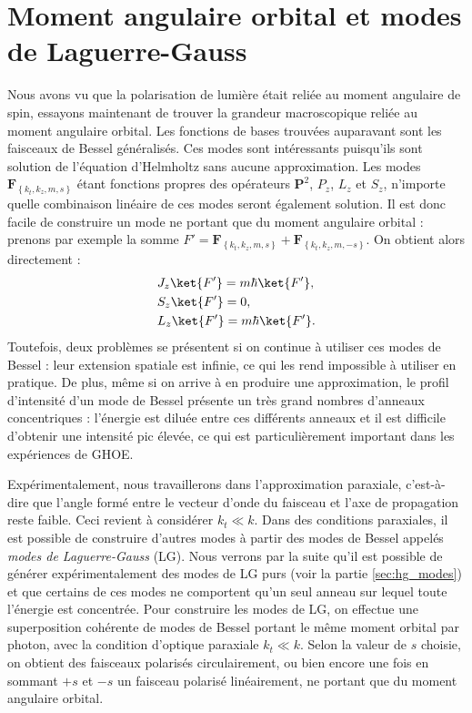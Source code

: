 \section{Moment angulaire orbital et modes de Laguerre-Gauss}
\label{sec:oamLG}
Nous avons vu que la polarisation de lumière était reliée au moment angulaire de spin, essayons maintenant de trouver la grandeur macroscopique reliée au moment angulaire orbital. 
Les fonctions de bases trouvées auparavant sont les faisceaux de Bessel généralisés. Ces modes sont intéressants puisqu'ils sont solution de l'équation d'Helmholtz sans aucune approximation. Les modes $\bm{F}_{\left\{k_t,k_z,m,s\right\}}$ étant fonctions propres des opérateurs $\bm{P}^2$, $P_z$, $L_z$ et $S_z$, n'importe quelle combinaison linéaire de ces modes seront également solution. Il est donc facile de construire un mode ne portant que du moment angulaire orbital : prenons par exemple la somme $F'=\bm{F}_{\left\{k_t,k_z,m,s\right\}}+\bm{F}_{\left\{k_t,k_z,m,-s\right\}}$. On obtient alors directement :
\begin{align*}
&J_z\ket{F'} = m\hbar\ket{F'},\\
&S_z\ket{F'} = 0,\\
&L_z\ket{F'} = m\hbar\ket{F'}.
\end{align*}
Toutefois, deux problèmes se présentent si on continue à utiliser ces modes de Bessel : leur extension spatiale est infinie, ce qui les rend impossible à utiliser en pratique. De plus, même si on arrive à en produire une approximation, le profil d'intensité d'un mode de Bessel présente un très grand nombres d'anneaux concentriques : l'énergie est diluée entre ces différents anneaux et il est difficile d'obtenir une intensité pic élevée, ce qui est particulièrement important dans les expériences de GHOE.\par Expérimentalement, nous travaillerons dans l'approximation paraxiale, c'est-à-dire que l'angle formé entre le vecteur d'onde du faisceau et l'axe de propagation reste faible. Ceci revient à considérer $k_t \ll k$. Dans des conditions paraxiales, il est possible de construire d'autres modes à partir des modes de Bessel appelés \textit{modes de Laguerre-Gauss} (LG). Nous verrons par la suite qu'il est possible de générer expérimentalement des modes de LG purs (voir la partie \ref{sec:hg_modes}) et que certains de ces modes ne comportent qu'un seul anneau sur lequel toute l'énergie est concentrée.
Pour construire les modes de LG, on effectue une superposition cohérente de modes de Bessel portant le même moment orbital par photon, avec la condition d'optique paraxiale $k_t \ll k$. Selon la valeur de $s$ choisie, on obtient des faisceaux polarisés circulairement, ou bien encore une fois en sommant $+s$ et $-s$ un faisceau polarisé linéairement, ne portant que du moment angulaire orbital.

